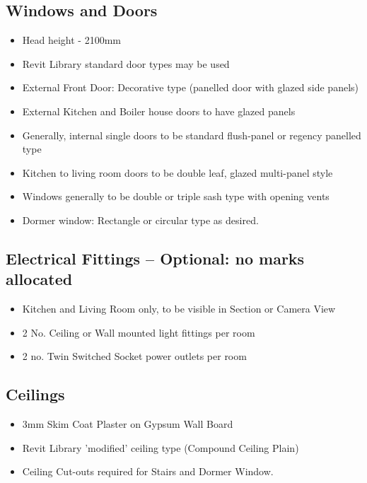 \subsection*{Windows and Doors}
\begin{itemize}
	\item Head height - 2100mm
	\item Revit Library standard door types may be used
	\item External Front Door: Decorative type (panelled door with glazed side panels)
	\item External Kitchen and Boiler house doors to have glazed panels
	\item Generally, internal single doors to be standard flush-panel or regency panelled type
	\item Kitchen to living room doors to be double leaf, glazed multi-panel style
	\item Windows generally to be double or triple sash type with opening vents
	\item Dormer window: Rectangle or circular type as desired.
\end{itemize}






\subsection*{Electrical Fittings -- Optional: no marks allocated}
\begin{itemize}
	\item Kitchen and Living Room only, to be visible in Section or Camera View
	\item 2 No. Ceiling or Wall mounted light fittings per room
	\item 2 no. Twin Switched Socket power outlets per room
\end{itemize}





\subsection*{Ceilings}
\begin{itemize}
	\item 3mm Skim Coat Plaster on Gypsum Wall Board
	\item Revit Library 'modified' ceiling type (Compound Ceiling Plain)
	\item Ceiling Cut-outs required for Stairs and Dormer Window.
\end{itemize}



